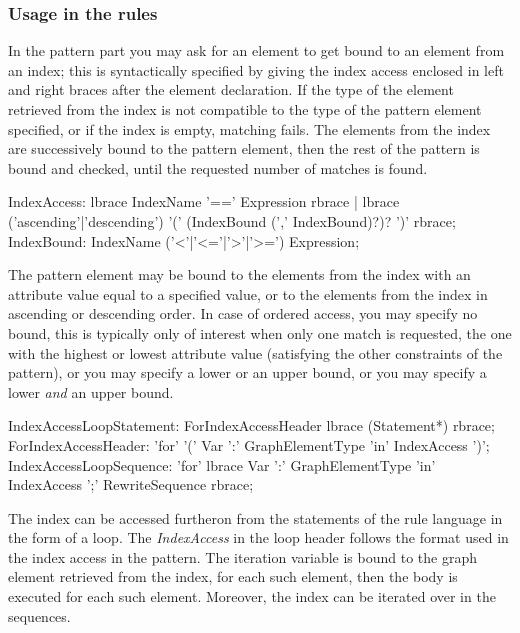 \subsubsection*{Usage in the rules}\label{sub:indexusage}

In the pattern part you may ask for an element to get bound to an element from an index;
this is syntactically specified by giving the index access enclosed in left and right braces after the element declaration.
If the type of the element retrieved from the index is not compatible to the type of the pattern element specified,
or if the index is empty, matching fails.
The elements from the index are successively bound to the pattern element, then the rest of the pattern is bound and checked, until the requested number of matches is found.

\begin{rail}
  IndexAccess:
    lbrace IndexName '==' Expression rbrace |
		lbrace ('ascending'|'descending') '(' (IndexBound (',' IndexBound)?)? ')' rbrace;
	IndexBound: IndexName ('<'|'<='|'>'|'>=') Expression;
\end{rail}

The pattern element may be bound to the elements from the index with an attribute value equal to a specified value,
or to the elements from the index in ascending or descending order.
In case of ordered access, you may specify no bound, this is typically only of interest when only one match is requested, the one with the highest or lowest attribute value (satisfying the other constraints of the pattern), or you may specify a lower or an upper bound, or you may specify a lower \emph{and} an upper bound.

\begin{rail}
  IndexAccessLoopStatement:
    ForIndexAccessHeader lbrace (Statement*) rbrace;
  ForIndexAccessHeader:
    'for' '(' Var ':' GraphElementType 'in' IndexAccess ')';
  IndexAccessLoopSequence:
    'for' lbrace Var ':' GraphElementType 'in' IndexAccess ';' RewriteSequence rbrace;
\end{rail}

The index can be accessed furtheron from the statements of the rule language in the form of a loop.
The \emph{IndexAccess} in the loop header follows the format used in the index access in the pattern.
The iteration variable is bound to the graph element retrieved from the index, for each such element, then the body is executed for each such element.
Moreover, the index can be iterated over in the sequences.

